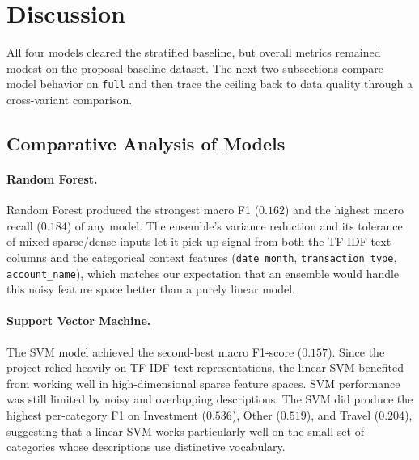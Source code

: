 \documentclass[11pt]{article}
\begin{document}
\FloatBarrier
\section{Discussion}

All four models cleared the stratified baseline, but overall metrics
remained modest on the proposal-baseline dataset. The next two
subsections compare model behavior on \texttt{full} and then trace
the ceiling back to data quality through a cross-variant comparison.

\subsection{Comparative Analysis of Models}

\paragraph{Random Forest.}
Random Forest produced the strongest macro F1 ($0.162$) and the highest
macro recall ($0.184$) of any model. The ensemble's variance reduction and
its tolerance of mixed sparse/dense inputs let it pick up signal from both
the TF-IDF text columns and the categorical context features
(\texttt{date\_month}, \texttt{transaction\_type}, \texttt{account\_name}),
which matches our expectation that an ensemble would handle this noisy
feature space better than a purely linear model.

\paragraph{Support Vector Machine.}
The SVM model achieved the second-best macro F1-score ($0.157$). Since the
project relied heavily on TF-IDF text representations, the linear SVM
benefited from working well in high-dimensional sparse feature spaces.
SVM performance was still limited by noisy and overlapping descriptions.
The SVM did produce the highest per-category F1 on Investment ($0.536$),
Other ($0.519$), and Travel ($0.204$), suggesting that a linear SVM
works particularly well on the small set of categories whose
descriptions use distinctive vocabulary.
\end{document}
